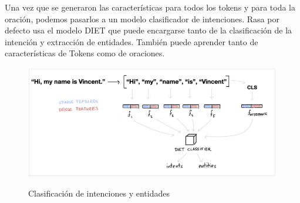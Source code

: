 Una vez que se generaron las características para todos los tokens y para toda la oración, podemos
pasarlos a un
modelo clasificador de intenciones. Rasa por defecto usa el modelo DIET que puede encargarse tanto
de
la clasificación de la intención y extracción de entidades. También puede aprender tanto de
características de Tokens como de oraciones. \cite{warmerdam_2022}
\begin{table}[]

	\caption{Clasificadores de intenciones. Elaboración propia}
	\label{IntentClassifier}
\end{table}
\begin{figure}[h]
	\centering
	\includegraphics[width=\textwidth]{imagenes/cap3/intent_classiffier.png}
	\caption{Clasificación de intenciones y entidades}
	\label{fig:intentclasification-MLU}
	\cite{Rasa}
\end{figure}

